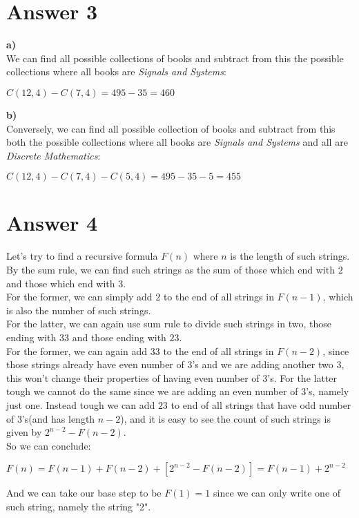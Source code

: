 \documentclass[12pt]{article}
\begin{document}
\section*{Answer 3}
\textbf{a)}\\
We can find all possible collections of books and subtract from this the possible collections where all books are \textit{Signals and Systems}:
\begin{center}
$C(12,4)-C(7,4)=495-35=460$
\end{center}
\textbf{b)}\\
Conversely, we can find all possible collection of books and subtract from this both the possible collections where all books are \textit{Signals and Systems} and all are \textit{Discrete Mathematics}:
\begin{center}
$C(12,4)-C(7,4)-C(5,4)=495-35-5=455$
\end{center}
\section*{Answer 4}
Let's try to find a recursive formula $F(n)$ where $n$ is the length of such strings. By the sum rule, we can find such strings as the sum of those which end with $2$ and those which end with $3$.\\
For the former, we can simply add $2$ to the end of all strings in $F(n-1)$, which is also the number of such strings.\\
For the latter, we can again use sum rule to divide such strings in two, those ending with $33$ and those ending with $23$.\\
For the former, we can again add $33$ to the end of all strings in $F(n-2)$, since those strings already have even number of 3's and we are adding another two 3, this won't change their properties of having even number of 3's. For the latter tough we cannot do the same since we are adding an even number of 3's, namely just one. Instead tough we can add $23$ to end of all strings that have odd number of 3's(and has length $n-2$), and it is easy to see the count of such strings is given by $2^{n-2}-F(n-2)$.\\
So we can conclude:
\begin{center}
$F(n)=F(n-1)+F(n-2)+[2^{n-2}-F(n-2)]=F(n-1)+2^{n-2}$
\end{center}
And we can take our base step to be $F(1)=1$ since we can only write one of such string, namely the string "2".
\end{document}
